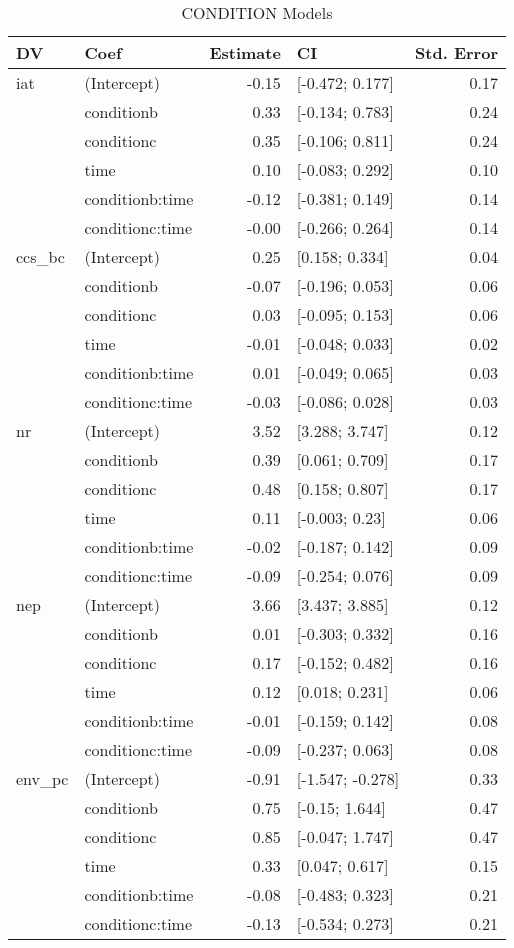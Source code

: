 \begin{table}[ht]
\centering
\begin{tabular}{llrlr}
  \hline
DV & Coef & Estimate & CI & Std. Error \\ 
  \hline
iat & (Intercept) & -0.15 & [-0.472; 0.177] & 0.17 \\ 
   & conditionb & 0.33 & [-0.134; 0.783] & 0.24 \\ 
   & conditionc & 0.35 & [-0.106; 0.811] & 0.24 \\ 
   & time & 0.10 & [-0.083; 0.292] & 0.10 \\ 
   & conditionb:time & -0.12 & [-0.381; 0.149] & 0.14 \\ 
   & conditionc:time & -0.00 & [-0.266; 0.264] & 0.14 \\ 
   \hline
ccs\_bc & (Intercept) & 0.25 & [0.158; 0.334] & 0.04 \\ 
   & conditionb & -0.07 & [-0.196; 0.053] & 0.06 \\ 
   & conditionc & 0.03 & [-0.095; 0.153] & 0.06 \\ 
   & time & -0.01 & [-0.048; 0.033] & 0.02 \\ 
   & conditionb:time & 0.01 & [-0.049; 0.065] & 0.03 \\ 
   & conditionc:time & -0.03 & [-0.086; 0.028] & 0.03 \\ 
   \hline
nr & (Intercept) & 3.52 & [3.288; 3.747] & 0.12 \\ 
   & conditionb & 0.39 & [0.061; 0.709] & 0.17 \\ 
   & conditionc & 0.48 & [0.158; 0.807] & 0.17 \\ 
   & time & 0.11 & [-0.003; 0.23] & 0.06 \\ 
   & conditionb:time & -0.02 & [-0.187; 0.142] & 0.09 \\ 
   & conditionc:time & -0.09 & [-0.254; 0.076] & 0.09 \\ 
   \hline
nep & (Intercept) & 3.66 & [3.437; 3.885] & 0.12 \\ 
   & conditionb & 0.01 & [-0.303; 0.332] & 0.16 \\ 
   & conditionc & 0.17 & [-0.152; 0.482] & 0.16 \\ 
   & time & 0.12 & [0.018; 0.231] & 0.06 \\ 
   & conditionb:time & -0.01 & [-0.159; 0.142] & 0.08 \\ 
   & conditionc:time & -0.09 & [-0.237; 0.063] & 0.08 \\ 
   \hline
env\_pc & (Intercept) & -0.91 & [-1.547; -0.278] & 0.33 \\ 
   & conditionb & 0.75 & [-0.15; 1.644] & 0.47 \\ 
   & conditionc & 0.85 & [-0.047; 1.747] & 0.47 \\ 
   & time & 0.33 & [0.047; 0.617] & 0.15 \\ 
   & conditionb:time & -0.08 & [-0.483; 0.323] & 0.21 \\ 
   & conditionc:time & -0.13 & [-0.534; 0.273] & 0.21 \\ 
   \hline
\end{tabular}
\caption{CONDITION Models } 
\label{tab:condition-models}
\end{table}
